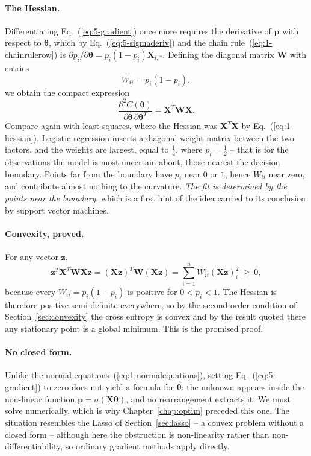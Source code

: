 \paragraph{The Hessian.}
Differentiating Eq.~(\ref{eq:5-gradient}) once more requires the derivative of
$\bm{p}$ with respect to $\bm{\theta}$, which by
Eq.~(\ref{eq:5-sigmaderiv}) and the chain rule~(\ref{eq:1-chainrulerow}) is
$\partial p_i/\partial\bm{\theta}=p_i(1-p_i)\bm{X}_{i,\ast}$.  Defining the
diagonal matrix $\bm{W}$ with entries
\begin{equation}
  W_{ii} = p_i\left(1-p_i\right),
  \label{eq:5-Wmatrix}
\end{equation}
we obtain the compact expression
\begin{equation}
  \boxed{\;
  \frac{\partial^{2}C(\bm{\theta})}{\partial\bm{\theta}\,\partial\bm{\theta}^{T}}
   = \bm{X}^{T}\bm{W}\bm{X} . \;}
  \label{eq:5-hessian}
\end{equation}
Compare again with least squares, where the Hessian was $\bm{X}^{T}\bm{X}$ by
Eq.~(\ref{eq:1-hessian}).  Logistic regression inserts a diagonal weight
matrix between the two factors, and the weights are largest, equal to
$\tfrac14$, where $p_i=\tfrac12$ -- that is for the observations the model is
most uncertain about, those nearest the decision boundary.  Points far from
the boundary have $p_i$ near $0$ or $1$, hence $W_{ii}$ near zero, and
contribute almost nothing to the curvature.  \emph{The fit is determined by
the points near the boundary}, which is a first hint of the idea carried to
its conclusion by support vector machines.

\paragraph{Convexity, proved.}
For any vector $\bm{z}$,
\begin{equation}
  \bm{z}^{T}\bm{X}^{T}\bm{W}\bm{X}\bm{z}
   = \left(\bm{X}\bm{z}\right)^{T}\bm{W}\left(\bm{X}\bm{z}\right)
   = \sum_{i=1}^{n}W_{ii}\left(\bm{X}\bm{z}\right)_i^{2} \ \ge\ 0,
  \label{eq:5-convexproof}
\end{equation}
because every $W_{ii}=p_i(1-p_i)$ is positive for $0<p_i<1$.  The Hessian is
therefore positive semi-definite everywhere, so by the second-order condition
of Section~\ref{sec:convexity} the cross entropy is convex and by the result
quoted there any stationary point is a global minimum.  This is the promised
proof.

\paragraph{No closed form.}
Unlike the normal equations~(\ref{eq:1-normalequations}), setting
Eq.~(\ref{eq:5-gradient}) to zero does not yield a formula for
$\hat{\bm{\theta}}$: the unknown appears inside the non-linear function
$\bm{p}=\sigma(\bm{X}\bm{\theta})$, and no rearrangement extracts it.  We must
solve numerically, which is why Chapter~\ref{chap:optim} preceded this one.
The situation resembles the Lasso of Section~\ref{sec:lasso} -- a convex
problem without a closed form -- although here the obstruction is
non-linearity rather than non-differentiability, so ordinary gradient methods
apply directly.

